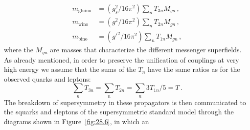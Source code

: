 \begin{equation}
  \begin{aligned}
    m_{\mathrm{gluino}}
      &=(g_s^2/16\pi^2)\sum_n T_{3n}M_{gn}\,,\\
    m_{\mathrm{wino}}
      &=(g^2/16\pi^2)\sum_n T_{2n}M_{gn}\,,\\
    m_{\mathrm{bino}}
      &=(g'^2/16\pi^2)\sum_n T_{1n}M_{gn}\,,
  \end{aligned}
  \tag{28.6.2}\label{eq:28.6.2}
\end{equation}
where the \(M_{gn}\) are masses that characterize the different messenger
superfields. As already mentioned, in order to preserve the unification of
couplings at very high energy we assume that the sums of the \(T_n\) have
the same ratios as for the observed quarks and leptons:
\begin{equation}
  \sum_n T_{3n}=\sum_n T_{2n}=\sum_n 3T_{1n}/5=T\,.
  \tag{28.6.3}\label{eq:28.6.3}
\end{equation}
The breakdown of supersymmetry in these propagators is then communicated
to the squarks and sleptons of the supersymmetric standard model through
the diagrams shown in Figure~\ref{fig:28.6}, in which an


